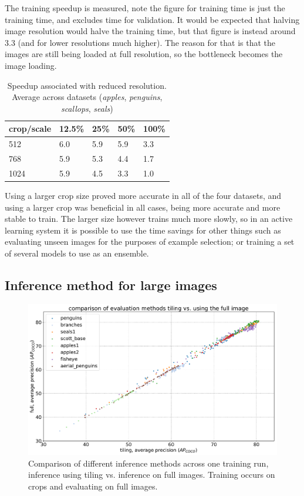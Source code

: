 The training speedup is measured, note the figure for training time is just the training time, and excludes time for validation. It would be expected that halving image resolution would halve the training time, but that figure is instead around $3.3$ (and for lower resolutions much higher). The reason for that is that the images are still being loaded at full resolution, so the bottleneck becomes the image loading.

\begin{table}[ht]
  \centering
    \caption{Speedup associated with reduced resolution. Average across datasets (\emph{apples}, \emph{penguins}, \emph{scallops}, \emph{seals})  }
  \begin{tabular}{ l | l l l l}
    crop/scale & 12.5\% & 25\% & 50\% & 100\% \\
    \toprule
        512   & 6.0  & 5.9  &  5.9  & 3.3 \\
        768   & 5.9 & 5.3  &  4.4 &  1.7 \\
        1024  & 5.9 & 4.5  &  3.3  & 1.0 \\
    \bottomrule
  \end{tabular}
\label{fig:accuracy_scale_crop}
\end{table}


Using a larger crop size proved more accurate in all of the four datasets, and using a larger crop was beneficial in all cases, being more accurate and more stable to train. The larger size however trains much more slowly, so in an active learning system it is possible to use the time savings for other things such as evaluating unseen images for the purposes of example selection; or training a set of several models to use as an ensemble.


\subsection {Inference method for large images}

\begin{figure}[h]
  \centering
  \includegraphics[width=1.0\linewidth]{charts/training/splits_scatters.pdf}
  \caption{Comparison of different inference methods across one training run, inference using tiling vs. inference on full images. Training occurs on crops and evaluating on full images. }  
  \label{fig:inference_method}
\end{figure}


